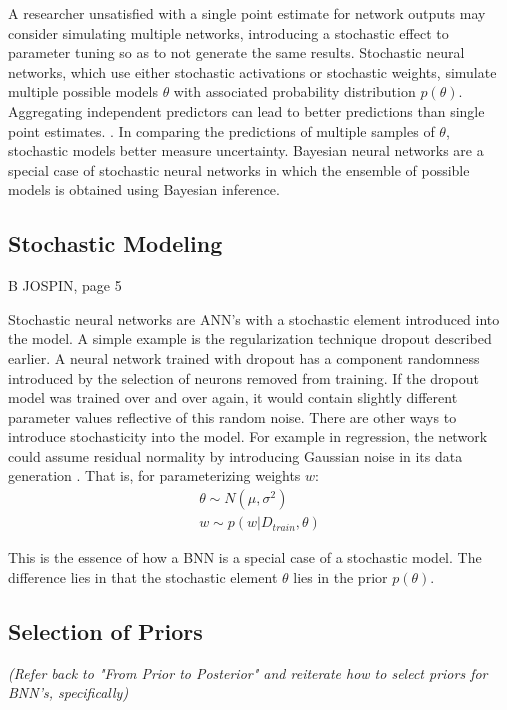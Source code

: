 A researcher unsatisfied with a single point estimate for network outputs may consider simulating multiple networks, introducing a stochastic effect to parameter tuning so as to not generate the same results. Stochastic neural networks, which use either stochastic activations or stochastic weights, simulate multiple possible models $\theta$ with associated probability distribution $p(\theta)$.  Aggregating independent predictors can lead to better predictions than single point estimates. \cite{Jospin}.  In comparing the predictions of multiple samples of $\theta$, stochastic models better measure uncertainty.  Bayesian neural networks are a special case of stochastic neural networks in which the ensemble of possible models is obtained using Bayesian inference. \cite{mackay1992practical}

\subsection{Stochastic Modeling} B
JOSPIN, page 5

Stochastic neural networks are ANN's with a stochastic element introduced into the model.  A simple example is the regularization technique dropout \cite{goan2020bayesian} described earlier.  A neural network trained with dropout has a component randomness introduced by the selection of neurons removed from training.  If the dropout model was trained over and over again, it would contain slightly different parameter values reflective of this random noise.  There are other ways to introduce stochasticity into the model.  For example in regression, the network could assume residual normality by introducing Gaussian noise in its data generation \cite{Jospin}.  That is, for parameterizing weights $w$:
\begin{gather*}
\theta \sim N(\mu,\sigma^2) \\
w \sim p(w|D_{train},\theta)
\end{gather*}

This is the essence of how a BNN is a special case of a stochastic model.  The difference lies in that the stochastic element $\theta$ lies in the prior $p(\theta)$.

\subsection{Selection of Priors}

\textit{(Refer back to "From Prior to Posterior" and reiterate how to select priors for BNN's, specifically)}


